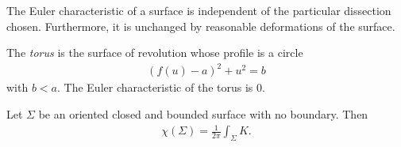 \documentclass{article}
\begin{document}
\begin{proposition}
    The Euler characteristic of a surface is independent of the particular dissection chosen.
    Furthermore, it is unchanged by reasonable deformations of the surface.
\end{proposition}

\begin{definition}
    The \emph{torus} is the surface of revolution whose profile is a circle 
    \begin{align*}
        (f(u)-a)^2 + u^2 = b
    \end{align*}
    with $b<a$. The Euler characteristic of the torus is $0$.
\end{definition}

\begin{theorem}
    Let $\Sigma$ be an oriented closed and bounded surface with no boundary. Then 
    \begin{align*}
        \chi(\Sigma) = \frac{1}{2\pi}\int_\Sigma K.
    \end{align*} 
\end{theorem}
\end{document}
